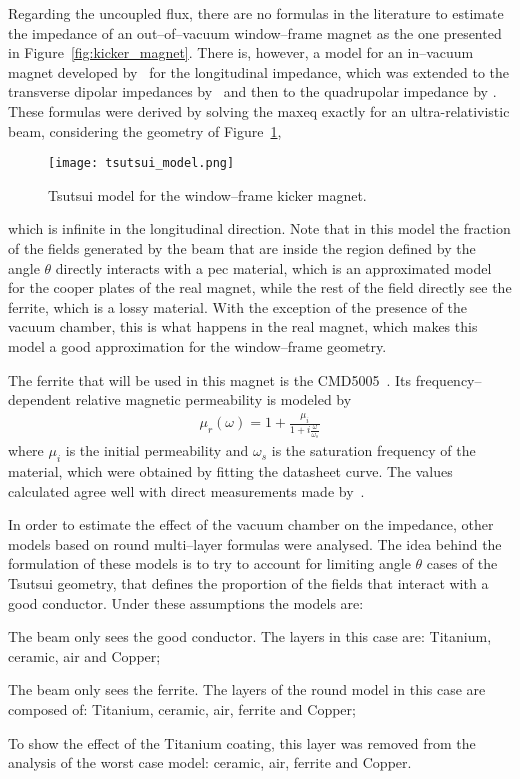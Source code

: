     Regarding the uncoupled flux, there are no formulas in the literature to estimate the impedance of an out--of--vacuum window--frame magnet as the one presented in Figure~\ref{fig:kicker_magnet}. There is, however, a model for an in--vacuum magnet developed by~ for the longitudinal impedance, which was extended to the transverse dipolar impedances by~ and then to the quadrupolar impedance by . These formulas were derived by solving the \gls{maxeq} exactly for an ultra-relativistic beam, considering the geometry of Figure~\ref{fig:tsutsui_model},
    \begin{figure}
        \centering
        \texttt{[image: tsutsui\_model.png]}
        \caption{Tsutsui model for the window--frame kicker magnet.}
        \label{fig:tsutsui_model}
    \end{figure}
    which is infinite in the longitudinal direction. Note that in this model the fraction of the fields generated by the beam that are inside the region defined by the angle $\theta$ directly interacts with a \gls{pec} material, which is an approximated model for the cooper plates of the real magnet, while the rest of the field directly see the ferrite, which is a lossy material. With the exception of the presence of the vacuum chamber, this is what happens in the real magnet, which makes this model a good approximation for the window--frame geometry.

    The ferrite that will be used in this magnet is the CMD5005~\cite{CeramicMagnets2017}. Its frequency--dependent relative magnetic permeability is modeled by
    \begin{align}
        \mu_r(\omega) = 1 + \frac{\mu_i}{1+i\frac{\omega}{\omega_s}}
    \end{align}
    where $\mu_i$ is the initial permeability and $\omega_s$ is the saturation frequency of the material, which were obtained by fitting the datasheet curve. The values calculated agree well with direct measurements made by~.

    In order to estimate the effect of the vacuum chamber on the impedance, other models based on round multi--layer formulas were analysed. The idea behind the formulation of these models is to try to account for limiting angle $\theta$ cases of the Tsutsui geometry, that defines the proportion of the fields that interact with a good conductor. Under these assumptions the models are:
    \begin{description}[align=left]
        \item[Best case (B):] The beam only sees the good conductor. The layers in this case are: Titanium, ceramic, air and Copper;
        \item[Worst case (W):] The beam only sees the ferrite. The layers of the round model in this case are composed of: Titanium, ceramic, air, ferrite and Copper;
        \item[No Coating (NC):] To show the effect of the Titanium coating, this layer was removed from the analysis of the worst case model: ceramic, air, ferrite and Copper.
    \end{description}

